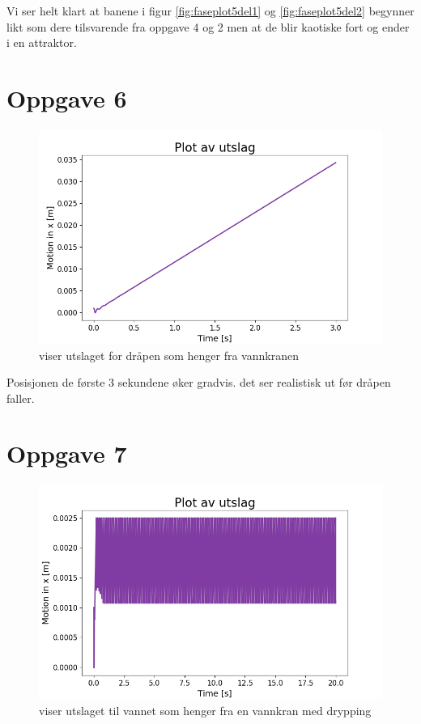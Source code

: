\documentclass[norsk,a4paper,12pt]{article}
\begin{document}
Vi ser helt klart at banene i figur \ref{fig:faseplot5del1} og  \ref{fig:faseplot5del2} begynner likt som dere tilsvarende fra oppgave 4 og 2 men at de blir kaotiske fort og ender i en attraktor.

\section*{Oppgave 6}

\begin{figure}[H]
\begin{center}
\includegraphics[scale=0.5]{Oppgave6utslag.png}
\caption{viser utslaget for dråpen som henger fra vannkranen}
\label{fig:faseplot5del2.png}
\end{center}
\end{figure}

Posisjonen de første 3 sekundene øker gradvis. det ser realistisk ut før dråpen faller.


\section*{Oppgave 7}

\begin{figure}[H]
\begin{center}
\includegraphics[scale=0.5]{Oppgave7utslag.png}
\caption{viser utslaget til vannet som henger fra en vannkran med drypping}
\label{fig:faseplot5del2.png}
\end{center}
\end{figure}
\end{document}

